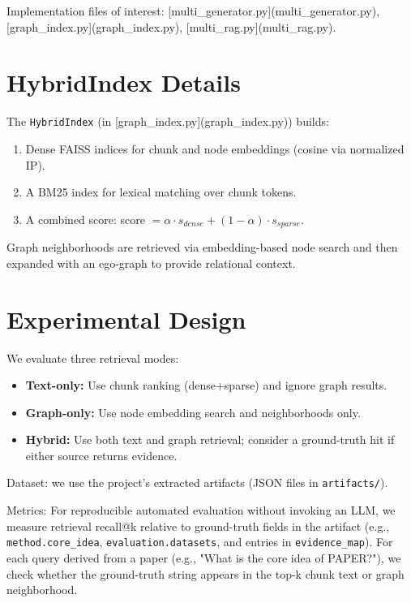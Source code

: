 \documentclass[conference]{IEEEtran}
\begin{document}
Implementation files of interest: [multi_generator.py](multi_generator.py), [graph_index.py](graph_index.py), [multi_rag.py](multi_rag.py).

\section{HybridIndex Details}
The \texttt{HybridIndex} (in [graph_index.py](graph_index.py)) builds:
\begin{enumerate}
  \item Dense FAISS indices for chunk and node embeddings (cosine via normalized IP).
  \item A BM25 index for lexical matching over chunk tokens.
  \item A combined score: score $= \alpha\cdot s_{dense} + (1-\alpha)\cdot s_{sparse}$.
\end{enumerate}

Graph neighborhoods are retrieved via embedding-based node search and
then expanded with an ego-graph to provide relational context.

\section{Experimental Design}
We evaluate three retrieval modes:
\begin{itemize}
  \item \textbf{Text-only:} Use chunk ranking (dense+sparse) and ignore graph results.
  \item \textbf{Graph-only:} Use node embedding search and neighborhoods only.
  \item \textbf{Hybrid:} Use both text and graph retrieval; consider a ground-truth hit if either source returns evidence.
\end{itemize}

Dataset: we use the project's extracted artifacts (JSON files in \texttt{artifacts/}).

Metrics: For reproducible automated evaluation without invoking an LLM,
we measure retrieval recall@k relative to ground-truth fields in the
artifact (e.g., \texttt{method.core\_idea}, \texttt{evaluation.datasets},
and entries in \texttt{evidence\_map}). For each query derived from a
paper (e.g., "What is the core idea of PAPER?"), we check whether the
ground-truth string appears in the top-k chunk text or graph neighborhood.
\end{document}
